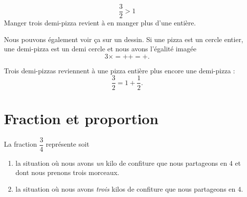 \begin{example}
    \begin{equation}
        \frac{ 3 }{ 2 }>1
    \end{equation}
    Manger trois demi-pizza revient à en manger plus d'une entière.

    Nous pouvons également voir ça sur un dessin. Si une pizza est un cercle entier, une demi-pizza est un demi cercle et nous avons l'égalité imagée
    \begin{equation}
        3\times =++=+.
    \end{equation}

    Trois demi-pizzas reviennent à une pizza entière plus encore une demi-pizza :
    \begin{equation}
        \frac{ 3 }{ 2 }=1+\frac{ 1 }{ 2 }.
    \end{equation}
\end{example}

\section{Fraction et proportion}

\begin{example}
    La fraction \( \dfrac{ 3 }{ 4 }\) représente soit
    \begin{enumerate}
        \item
            la situation où nous avons \emph{un} kilo de confiture que nous partageons en \( 4\) et dont nous prenons trois morceaux.
        \item
            la situation où nous avons \emph{trois} kilos de confiture que nous partageons en \( 4\).
    \end{enumerate}
\end{example}

